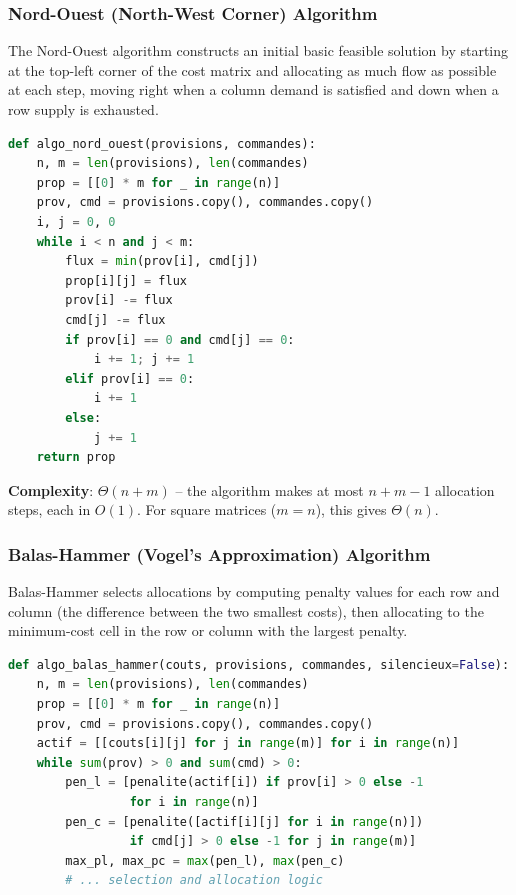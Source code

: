 \documentclass[12pt,a4paper]{article}
\begin{document}
\subsubsection{Nord-Ouest (North-West Corner) Algorithm}

The Nord-Ouest algorithm constructs an initial basic feasible solution by starting at the top-left corner of the cost matrix and allocating as much flow as possible at each step, moving right when a column demand is satisfied and down when a row supply is exhausted.

\begin{lstlisting}[language=Python, caption={Nord-Ouest Algorithm}]
def algo_nord_ouest(provisions, commandes):
    n, m = len(provisions), len(commandes)
    prop = [[0] * m for _ in range(n)]
    prov, cmd = provisions.copy(), commandes.copy()
    i, j = 0, 0
    while i < n and j < m:
        flux = min(prov[i], cmd[j])
        prop[i][j] = flux
        prov[i] -= flux
        cmd[j] -= flux
        if prov[i] == 0 and cmd[j] == 0:
            i += 1; j += 1
        elif prov[i] == 0:
            i += 1
        else:
            j += 1
    return prop
\end{lstlisting}

\textbf{Complexity}: $\Theta(n + m)$ -- the algorithm makes at most $n + m - 1$ allocation steps, each in $O(1)$. For square matrices ($m = n$), this gives $\Theta(n)$.

\subsubsection{Balas-Hammer (Vogel's Approximation) Algorithm}

Balas-Hammer selects allocations by computing penalty values for each row and column (the difference between the two smallest costs), then allocating to the minimum-cost cell in the row or column with the largest penalty.

\begin{lstlisting}[language=Python, caption={Balas-Hammer Algorithm (core loop)}]
def algo_balas_hammer(couts, provisions, commandes, silencieux=False):
    n, m = len(provisions), len(commandes)
    prop = [[0] * m for _ in range(n)]
    prov, cmd = provisions.copy(), commandes.copy()
    actif = [[couts[i][j] for j in range(m)] for i in range(n)]
    while sum(prov) > 0 and sum(cmd) > 0:
        pen_l = [penalite(actif[i]) if prov[i] > 0 else -1
                 for i in range(n)]
        pen_c = [penalite([actif[i][j] for i in range(n)])
                 if cmd[j] > 0 else -1 for j in range(m)]
        max_pl, max_pc = max(pen_l), max(pen_c)
        # ... selection and allocation logic
\end{lstlisting}
\end{document}
